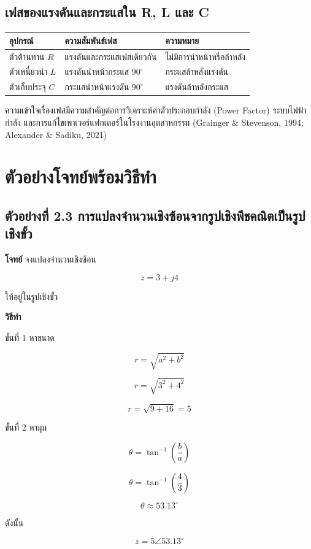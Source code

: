 \subsection{เฟสของแรงดันและกระแสใน R, L และ C}

\begin{longtable}{L{0.25\textwidth}L{0.35\textwidth}L{0.32\textwidth}}
\toprule
\textbf{อุปกรณ์} & \textbf{ความสัมพันธ์เฟส} & \textbf{ความหมาย} \\
\midrule
ตัวต้านทาน $R$ & แรงดันและกระแสเฟสเดียวกัน & ไม่มีการนำหน้าหรือล้าหลัง \\
ตัวเหนี่ยวนำ $L$ & แรงดันนำหน้ากระแส $90^\circ$ & กระแสล้าหลังแรงดัน \\
ตัวเก็บประจุ $C$ & กระแสนำหน้าแรงดัน $90^\circ$ & แรงดันล้าหลังกระแส \\
\bottomrule
\end{longtable}

ความเข้าใจเรื่องเฟสมีความสำคัญต่อการวิเคราะห์ค่าตัวประกอบกำลัง (Power Factor)
ระบบไฟฟ้ากำลัง และการแก้ไขเพาเวอร์แฟกเตอร์ในโรงงานอุตสาหกรรม
(Grainger \& Stevenson, 1994; Alexander \& Sadiku, 2021)

\section{ตัวอย่างโจทย์พร้อมวิธีทำ}

\subsection*{ตัวอย่างที่ 2.3 การแปลงจำนวนเชิงซ้อนจากรูปเชิงพีชคณิตเป็นรูปเชิงขั้ว}

\textbf{โจทย์}  
จงแปลงจำนวนเชิงซ้อน

\[
z=3+j4
\]

ให้อยู่ในรูปเชิงขั้ว

\textbf{วิธีทำ}

ขั้นที่ 1 หาขนาด

\[
r=\sqrt{a^2+b^2}
\]

\[
r=\sqrt{3^2+4^2}
\]

\[
r=\sqrt{9+16}=5
\]

ขั้นที่ 2 หามุม

\[
\theta=\tan^{-1}\left(\frac{b}{a}\right)
\]

\[
\theta=\tan^{-1}\left(\frac{4}{3}\right)
\]

\[
\theta\approx 53.13^\circ
\]

ดังนั้น

\[
z=5\angle 53.13^\circ
\]

